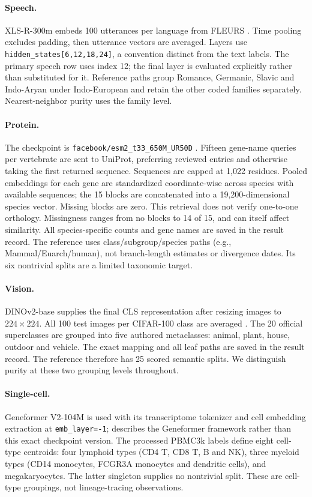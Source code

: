 \documentclass[mlmain]{jmlr}
\begin{document}
\paragraph{Speech.}
XLS-R-300m \citep{babu2022xlsr} embeds 100 utterances per language from FLEURS
\citep{conneau2022fleurs}. Time pooling excludes padding, then utterance vectors are averaged.
Layers use \texttt{hidden\_states[6,12,18,24]}, a convention distinct from the text labels. The
primary speech row uses index 12; the final layer is evaluated explicitly rather than substituted
for it. Reference paths group Romance, Germanic, Slavic and Indo-Aryan under Indo-European and
retain the other coded families separately. Nearest-neighbor purity uses the family level.

\paragraph{Protein.}
The checkpoint is \texttt{facebook/esm2\_t33\_650M\_UR50D} \citep{lin2023evolutionary}.
Fifteen gene-name queries per vertebrate are sent to UniProt, preferring reviewed entries and
otherwise taking the first returned sequence. Sequences are capped at 1,022 residues. Pooled
embeddings for each gene are standardized coordinate-wise across species with available sequences;
the 15 blocks are concatenated into a 19,200-dimensional species vector. Missing blocks are zero.
This retrieval does not verify one-to-one orthology. Missingness ranges from no blocks to 14 of 15,
and can itself affect similarity. All species-specific counts and gene names are saved in the
result record. The reference uses class/subgroup/species paths (e.g., Mammal/Euarch/human), not
branch-length estimates or divergence dates. Its six nontrivial splits are a limited taxonomic
target.

\paragraph{Vision.}
DINOv2-base \citep{oquab2024dinov2} supplies the final CLS representation after resizing images to
$224\times224$. All 100 test images per CIFAR-100 class are averaged
\citep{krizhevsky2009learning}. The 20 official superclasses are grouped into five authored
metaclasses: animal, plant, house, outdoor and vehicle. The exact mapping and all leaf paths are
saved in the result record. The reference therefore has 25 scored semantic splits. We distinguish purity at
these two grouping levels throughout.

\paragraph{Single-cell.}
Geneformer V2-104M is used with its transcriptome tokenizer and cell embedding extraction at
\texttt{emb\_layer=-1}; \citet{theodoris2023transfer} describes the Geneformer framework rather
than this exact checkpoint version. The processed PBMC3k labels \citep{zheng2017massively} define
eight cell-type centroids: four lymphoid types (CD4 T, CD8 T, B and NK), three myeloid types (CD14
monocytes, FCGR3A monocytes and dendritic cells), and megakaryocytes. The latter singleton supplies
no nontrivial split. These are cell-type groupings, not lineage-tracing observations.
\end{document}
